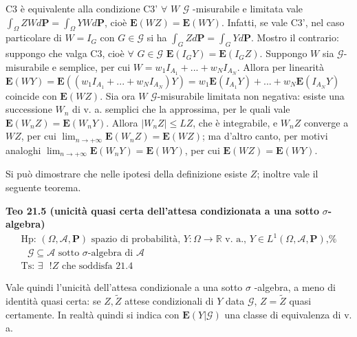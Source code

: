 \documentclass{article}
\begin{document}
C3 \`{e} equivalente alla condizione C3' $\forall $ $W$ $\mathcal{G}$%
-misurabile e limitata vale $\int_{\Omega }ZWd\mathbf{P=}\int_{\Omega }YWd%
\mathbf{P}$, cio\`{e} $\mathbf{E}\left( WZ\right) =\mathbf{E}\left(
WY\right) $. Infatti, se vale C3', nel caso particolare di $W=I_{G}$ con $%
G\in \mathcal{G}$ si ha $\int_{G}Zd\mathbf{P=}\int_{G}Yd\mathbf{P}$. Mostro
il contrario: suppongo che valga C3, cio\`{e} $\forall $ $G\in \mathcal{G}$ $%
\mathbf{E}\left( I_{G}Y\right) =\mathbf{E}\left( I_{G}Z\right) $. Suppongo $%
W $ sia $\mathcal{G}$-misurabile e semplice, per cui $%
W=w_{1}I_{A_{1}}+...+w_{N}I_{A_{N}}$. Allora per linearit\`{a} $\mathbf{E}%
\left( WY\right) =\mathbf{E}\left( \left(
w_{1}I_{A_{1}}+...+w_{N}I_{A_{N}}\right) Y\right) =w_{1}\mathbf{E}\left(
I_{A_{1}}Y\right) +...+w_{N}\mathbf{E}\left( I_{A_{N}}Y\right) $ coincide
con $\mathbf{E}\left( WZ\right) $. Sia ora $W$ $\mathcal{G}$-misurabile
limitata non negativa: esiste una successione $W_{n}$ di v. a. semplici che
la approssima, per le quali vale $\mathbf{E}\left( W_{n}Z\right) =\mathbf{E}%
\left( W_{n}Y\right) $. Allora $\left\vert W_{n}Z\right\vert \leq LZ$, che 
\`{e} integrabile, e $W_{n}Z$ converge a $WZ$, per cui $\lim_{n\rightarrow
+\infty }\mathbf{E}\left( W_{n}Z\right) =\mathbf{E}\left( WZ\right) $; ma
d'altro canto, per motivi analoghi $\lim_{n\rightarrow +\infty }\mathbf{E}%
\left( W_{n}Y\right) =\mathbf{E}\left( WY\right) $, per cui $\mathbf{E}%
\left( WZ\right) =\mathbf{E}\left( WY\right) $.

Si pu\`{o} dimostrare che nelle ipotesi della definizione esiste $Z$;
inoltre vale il seguente teorema.

\textbf{Teo 21.5 (unicit\`{a} quasi certa dell'attesa condizionata a una
sotto }$\sigma $\textbf{-algebra)}%
\begin{gather*}
\text{Hp: }\left( \Omega ,\mathcal{A},\mathbf{P}\right) \text{ spazio di
probabilit\`{a}, }Y:\Omega \rightarrow 
\mathbb{R}
\text{ v. a., }Y\in L^{1}\left( \Omega ,\mathcal{A},\mathbf{P}\right) \text{,%
} \\
\text{ }\mathcal{G\subseteq A}\text{ sotto }\sigma \text{-algebra di }%
\mathcal{A} \\
\text{Ts: }\exists \text{ }!Z\text{ che soddisfa 21.4}
\end{gather*}

Vale quindi l'unicit\`{a} dell'attesa condizionale a una sotto $\sigma $%
-algebra, a meno di identit\`{a} quasi certa: se $Z,\tilde{Z}$ attese
condizionali di $Y$ data $\mathcal{G}$, $Z=\tilde{Z}$ quasi certamente. In
realt\`{a} quindi si indica con $\mathbf{E}\left( Y|\mathcal{G}\right) $ una
classe di equivalenza di v. a.
\end{document}
